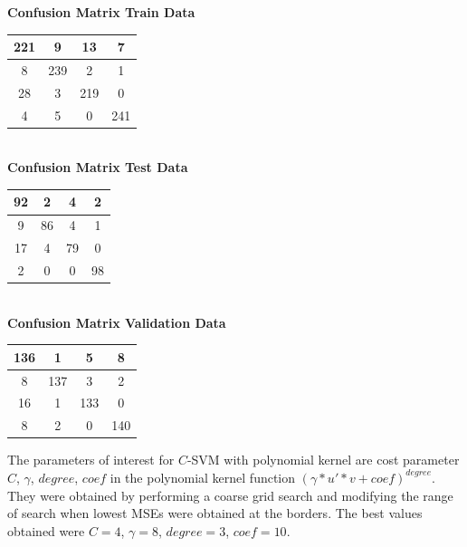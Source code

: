\documentclass{article}
\begin{document}
\begin{flushleft}
\textbf{Confusion Matrix Train Data\\[5pt]}
\begin{tabular}{|c|c|c|c|}
\hline
221 & 9 & 13 & 7 \\
\hline
8 & 239 & 2 & 1 \\
\hline
28 & 3 & 219 & 0 \\
\hline
4 & 5 & 0 & 241 \\
\hline
\end{tabular}
\textbf{\\[10pt] Confusion Matrix Test Data \\[5pt]}
\begin{tabular}{|c|c|c|c|}
\hline
92 & 2 & 4 & 2 \\
\hline
9 & 86 & 4 & 1 \\
\hline
17 & 4 & 79 & 0 \\
\hline
2 & 0 & 0 & 98 \\
\hline
\end{tabular}
\textbf{\\[10pt] Confusion Matrix Validation Data \\[5pt]}
\begin{tabular}{|c|c|c|c|}
\hline
136 & 1 & 5 & 8 \\
\hline
8 & 137 & 3 & 2 \\
\hline
16 & 1 & 133 & 0 \\
\hline
8 & 2 & 0 & 140 \\
\hline
\end{tabular}
\end{flushleft}


The parameters of interest for $C$-SVM with polynomial kernel are cost parameter $C$, $\gamma$, $degree$, $coef$ in the polynomial kernel function $(\gamma*u'*v+coef)^{degree}$. They were obtained by performing a coarse grid search and modifying the range of search when lowest MSEs were obtained at the borders.
The best values obtained were $C=4$, $\gamma=8$, $degree=3$, $coef=10$.

\newpage
\end{document}
